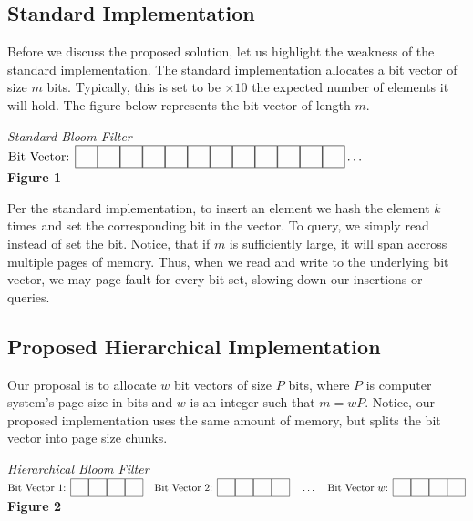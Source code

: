 \newcommand{\sep}{\hspace*{0.15in}}
\newcommand\cell{%
    \fbox{\rule{0.15in}{0pt}\rule[-0.5ex]{0pt}{0.15in}}}

\subsection{Standard Implementation}
Before we discuss the proposed solution, let us highlight the weakness of the standard implementation.
The standard implementation allocates a bit vector of size $m$ bits. Typically, this is set to be $\times 10$ the expected number of elements it will hold.
The figure below represents the bit vector of length $m$.

\begin{center}
    \textit{Standard Bloom Filter}
    \vspace{10pt}\\
    $\text{Bit Vector: } \cell\cell\cell\cell\cell\cell\cell\cell\cell\cell\cell\cell \ldots$
    \vspace{10pt}\\
    \textbf{Figure 1}
\end{center}

Per the standard implementation, to insert an element we hash the element $k$ times and set the corresponding bit in the vector.
To query, we simply read instead of set the bit.
Notice, that if $m$ is sufficiently large, it will span accross multiple pages of memory. 
Thus, when we read and write to the underlying bit vector, we may page fault for every bit set, slowing down our insertions or queries.

\subsection{Proposed Hierarchical Implementation}
Our proposal is to allocate $w$ bit vectors of size $P$ bits, where $P$ is computer system's page size in bits and $w$ is an integer such that $m = w P$.
Notice, our proposed implementation uses the same amount of memory, but  splits the bit vector into page size chunks.

\begin{center}
    \textit{Hierarchical Bloom Filter}
    \vspace{10pt}\\
    $\text{Bit Vector 1: }\cell\cell\cell\cell \sep \text{Bit Vector 2: }\cell\cell\cell\cell \sep \ldots \sep \text{Bit Vector $w$: }\cell\cell\cell\cell$
    \vspace{10pt}\\
    \textbf{Figure 2}
\end{center}

